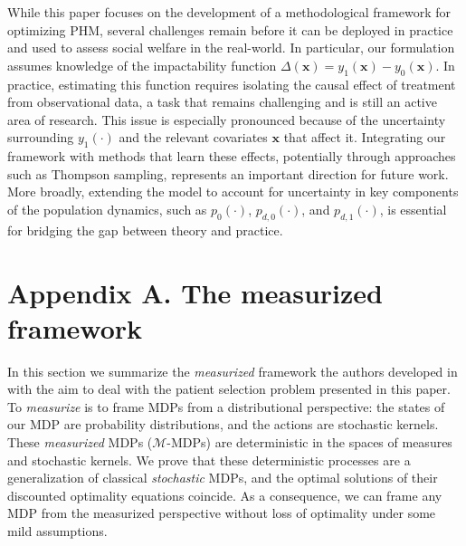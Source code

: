 \documentclass[12pt,a4paper]{article}
\newcommand{\bx}{\mathbf{x}}
\newcommand{\mM}{\mathcal{M}}
\begin{document}
While this paper focuses on the development of a methodological framework for optimizing PHM, several challenges remain before it can be deployed in practice and used to assess social welfare in the real-world. In particular, our formulation assumes knowledge of the impactability function $\Delta(\bx)=y_1(\bx)-y_0(\bx)$. In practice, estimating this function requires isolating the causal effect of treatment from observational data, a task that remains challenging and is still an active area of research.
This issue is especially pronounced because of the uncertainty surrounding $y_1(\cdot)$ and the relevant covariates $\bx$ that affect it. Integrating our framework with methods that learn these effects, potentially through approaches such as Thompson sampling, represents an important direction for future work. More broadly, extending the model to account for uncertainty in key components of the population dynamics, such as $p_0(\cdot)$, $p_{d,0}(\cdot)$, and $p_{d,1}(\cdot)$, is essential for bridging the gap between theory and practice.








		
\color{black}


 		
		
		
		\section*{Appendix A. The measurized framework \label{sec:measurized}}
		
		In this section we summarize the {\it measurized} framework the authors developed in \cite{measurized} with the aim to deal with the patient selection problem presented in this paper. To {\it measurize}  is to frame MDPs from a distributional perspective: the states of our MDP are probability distributions, and the actions are stochastic kernels. These {\it measurized} MDPs ($\mM$-MDPs) are deterministic in the spaces of measures and stochastic kernels. We prove that these deterministic processes are a generalization of classical {\it stochastic} MDPs, and the optimal solutions of their discounted optimality equations coincide. As a consequence, we can frame any MDP from the measurized perspective without loss of optimality under some mild assumptions. 
		
\end{document}
